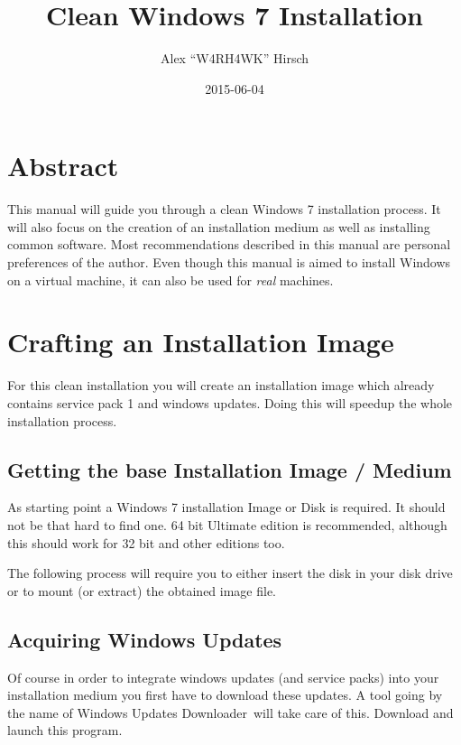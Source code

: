 \documentclass{itsarticle}
\title{Clean Windows 7 Installation}
\author{Alex ``W4RH4WK'' Hirsch}
\date{2015-06-04}
\begin{document}
\maketitle

\section*{Abstract}
\label{sec:abstract}

This manual will guide you through a clean Windows 7 installation process. It
will also focus on the creation of an installation medium as well as installing
common software. Most recommendations described in this manual are personal
preferences of the author. Even though this manual is aimed to install Windows
on a virtual machine, it can also be used for \emph{real} machines.

\tableofcontents

\newpage

\section{Crafting an Installation Image}
\label{sec:install_image}

For this clean installation you will create an installation image which already
contains service pack 1 and windows updates. Doing this will speedup the whole
installation process.

\subsection{Getting the base Installation Image / Medium}
\label{sub:win7_base_iso}

As starting point a Windows 7 installation Image or Disk is required. It
should not be that hard to find one. 64 bit Ultimate edition is recommended,
although this should work for 32 bit and other editions too.

The following process will require you to either insert the disk in your disk
drive or to mount (or extract) the obtained image file.

\subsection{Acquiring Windows Updates}
\label{sub:get_win7_updates}

Of course in order to integrate windows updates (and service packs) into your
installation medium you first have to download these updates. A tool going by
the name of Windows Updates Downloader\footnotemark\ will take care of this.
Download and launch this program.
\end{document}

